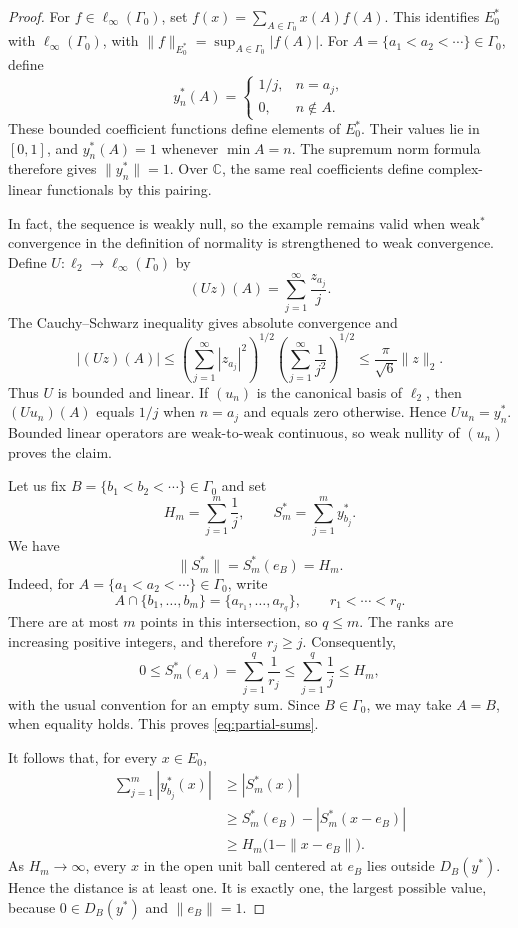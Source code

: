 \documentclass[11pt,a4paper]{amsart}
\theoremstyle{remark}
\begin{document}
\begin{proof}
For $f\in\ell_\infty(\Gamma_0)$, set
$f(x)=\sum_{A\in\Gamma_0}x(A)f(A)$.
This identifies $E_0^*$ with $\ell_\infty(\Gamma_0)$, with
$\|f\|_{E_0^*}=\sup_{A\in\Gamma_0}|f(A)|$. For
$A=\{a_1<a_2<\cdots\}\in\Gamma_0$, define
\[
 y_n^*(A)=
 \begin{cases}
  1/j,&n=a_j,\\
  0,&n\notin A.
 \end{cases}
\]
These bounded coefficient functions define elements of $E_0^*$. Their
values lie in $[0,1]$, and $y_n^*(A)=1$ whenever $\min A=n$.
The supremum norm formula therefore gives $\|y_n^*\|=1$. Over
$\mathbb C$, the same real coefficients define complex-linear
functionals by this pairing.

In fact, the sequence is weakly null, so the example remains valid when
weak$^*$ convergence in the definition of normality is strengthened
to weak convergence. Define $U:\ell_2\to\ell_\infty(\Gamma_0)$ by
\[
 (Uz)(A)=\sum_{j=1}^{\infty}\frac{z_{a_j}}j.
\]
The Cauchy--Schwarz inequality gives absolute convergence and
\[
 |(Uz)(A)|
 \leqslant\left(\sum_{j=1}^{\infty}|z_{a_j}|^2\right)^{1/2}
            \left(\sum_{j=1}^{\infty}\frac1{j^2}\right)^{1/2}
 \leqslant\frac\pi{\sqrt6}\|z\|_2.
\]
Thus $U$ is bounded and linear. If $(u_n)$ is the canonical basis of
$\ell_2$, then $(Uu_n)(A)$ equals $1/j$ when $n=a_j$ and equals
zero otherwise. Hence $Uu_n=y_n^*$. Bounded linear operators are
weak-to-weak continuous, so weak nullity of $(u_n)$ proves the claim.

Let us fix $B=\{b_1<b_2<\cdots\}\in\Gamma_0$ and set
\[
 H_m=\sum_{j=1}^m\frac1j,
 \qquad S_m^*=\sum_{j=1}^m y_{b_j}^*.
\]
We have
\begin{equation}\label{eq:partial-sums}
 \|S_m^*\|=S_m^*(e_B)=H_m.
\end{equation}
Indeed, for $A=\{a_1<a_2<\cdots\}\in\Gamma_0$, write
\[
 A\cap\{b_1,\ldots,b_m\}=\{a_{r_1},\ldots,a_{r_q}\},
 \qquad r_1<\cdots<r_q.
\]
There are at most $m$ points in this intersection, so $q\leqslant m$.
The ranks are increasing positive integers, and therefore
$r_j\geqslant j$. Consequently,
\[
 0\leqslant S_m^*(e_A)
 =\sum_{j=1}^q\frac1{r_j}
 \leqslant\sum_{j=1}^q\frac1j
 \leqslant H_m,
\]
with the usual convention for an empty sum. Since $B\in\Gamma_0$,
we may take $A=B$, when equality holds. This proves
\eqref{eq:partial-sums}.

It follows that, for every $x\in E_0$,
\begin{align*}
 \sum_{j=1}^m|y_{b_j}^*(x)|
 &\geqslant |S_m^*(x)|\\
 &\geqslant S_m^*(e_B)-|S_m^*(x-e_B)|\\
 &\geqslant H_m\bigl(1-\|x-e_B\|\bigr).
\end{align*}
As $H_m\to\infty$, every $x$ in the open unit ball centered at $e_B$
lies outside $D_B(y^*)$. Hence the distance is at least one. It is
exactly one, the largest possible value, because $0\in D_B(y^*)$
and $\|e_B\|=1$.
\end{proof}
\end{document}
